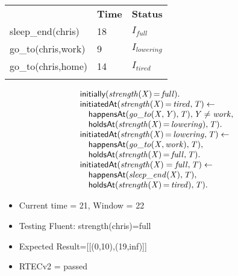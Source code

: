 \documentclass[8pt]{beamer}
\DeclareMathOperator{\val}{=}  %
\def \patsize {}
\def\happensAt{\textsf{\patsize happensAt}}
\def\initially{\textsf{\patsize initially}}
\def\holdsAt{\textsf{\patsize holdsAt}}
\def\initiatedAt{\textsf{\patsize initiatedAt}}
\newenvironment{mysplit}%
  {\arraycolsep 0pt \begin{array}{l}}%
  {\end{array}}
\begin{document}
\begin{frame}
\begin{minipage}{0.4\linewidth}
\begin{table}[t!]
\begin{center}
                \begin{tabular}{lll}
                    \hline\noalign{\smallskip}
                    \multicolumn{1}{l}{\textbf{Event}} & \multicolumn{1}{c}{\textbf{Time}} & \multicolumn{1}{c}{\textbf{Status}} \\
                    sleep\_end(chris)& 18 & $I_{full}$\\
                    go\_to(chris,work)& 9 & $I_{lowering}$\\
                    go\_to(chris,home)& 14 & $I_{tired}$\\
                    \noalign{\smallskip}
                    \hline
                \end{tabular}
            \end{center}
        \end{table}
    \end{minipage}
    \begin{minipage}{0.55\linewidth}
        \begin{align*}
            \begin{mysplit}
                \initially\mathit{(strength(X)\val full)}.\\
                \initiatedAt\mathit{(strength(X)\val tired,T)\leftarrow}\\
                \quad    \happensAt\mathit{(go\_to(X,Y),T),Y\neq work,}\\
                \quad    \holdsAt\mathit{(strength(X)\val lowering),T).}\\
                \initiatedAt\mathit{(strength(X)\val lowering,T)\leftarrow}\\
                \quad    \happensAt\mathit{(go\_to(X,work),T),}\\
                \quad    \holdsAt\mathit{(strength(X)\val full,T).}\\
                \initiatedAt\mathit{(strength(X)=full,T)\leftarrow}\\
                \quad    \happensAt\mathit{(sleep\_end(X),T),}\\
                \quad    \holdsAt\mathit{(strength(X)\val tired),T).}\\
            \end{mysplit}
        \end{align*}
    \end{minipage}
    \begin{itemize}
        \item Current time = 21, Window = 22
        \item Testing Fluent: strength(chris)=full
        \item Expected Result=[[(0,10),(19,inf)]]
        \item RTECv2 = passed
    \end{itemize}
\end{frame}
\end{document}
